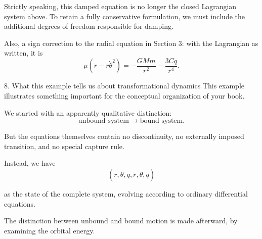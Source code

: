 Strictly speaking, this damped equation is no longer the closed Lagrangian system above. To retain a fully conservative formulation, we must include the additional degrees of freedom responsible for damping.

Also, a sign correction to the radial equation in Section 3: with the Lagrangian as written, it is
\[
\boxed{
\mu(\ddot r-r\dot\theta^2)
=-\frac{GMm}{r^2}
-\frac{3Cq}{r^4}.
}
\]


8. What this example tells us about transformational dynamics
This example illustrates something important for the conceptual organization of your book.

We started with an apparently qualitative distinction:
\[
\text{unbound system}
\longrightarrow
\text{bound system}.
\]

But the equations themselves contain no discontinuity, no externally imposed transition, and no special capture rule.

Instead, we have
\[
(r,\theta,q,\dot r,\dot\theta,\dot q)
\]

as the state of the complete system, evolving according to ordinary differential equations.

The distinction between unbound and bound motion is made afterward, by examining the orbital energy.

